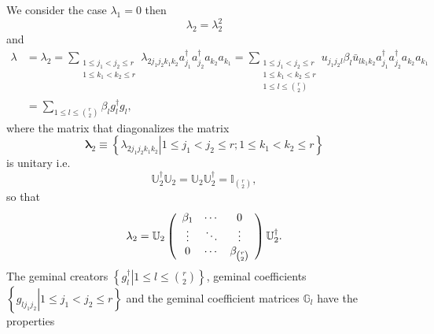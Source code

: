\documentclass[aps,preprint,amsfonts,amssymb,showpacs,showkeys]{revtex4}%
\begin{document}
We consider the case $\lambda_{1}=0$ then
\begin{equation}
\lambda_{2}=\lambda_{2}^{2} \label{idem2}%
\end{equation}
and%
\begin{align}
\lambda &  =\lambda_{2}=\sum_{\substack{1\leq j_{1}<j_{2}\leq r\\1\leq
k_{1}<k_{2}\leq r}}\lambda_{2j_{1}j_{2}k_{1}k_{2}}a_{j_{1}}^{\dagger}a_{j_{2}%
}^{\dagger}a_{k_{2}}a_{k_{1}}=\sum_{\substack{1\leq j_{1}<j_{2}\leq r\\1\leq
k_{1}<k_{2}\leq r\\1\leq l\leq\binom{r}{2}}}u_{j_{1}j_{2}l}\beta_{l}\bar
{u}_{lk_{1}k_{2}}a_{j_{1}}^{\dagger}a_{j_{2}}^{\dagger}a_{k_{2}}a_{k_{1}%
}\nonumber\\
&  =\sum_{1\leq l\leq\binom{r}{2}}\beta_{l}g_{l}^{\dagger}g_{l},
\label{expan_lamda2}%
\end{align}
where the matrix that diagonalizes the matrix
\begin{equation}
\mathbf{\lambda}_{2}\equiv\left\{  \left.  \lambda_{2j_{1}j_{2}k_{1}k_{2}%
}\right\vert 1\leq j_{1}<j_{2}\leq r;1\leq k_{1}<k_{2}\leq r\right\}
\end{equation}
is unitary i.e.
\begin{equation}
\mathbb{U}_{2}^{\dagger}\mathbb{U}_{2}=\mathbb{U}_{2}\mathbb{U}_{2}^{\dagger
}=\mathbb{I}_{\binom{r}{2}},
\end{equation}
so that
\begin{equation}
\mathbf{\lambda}_{2}=\mathbb{U}_{2}\left(
\begin{array}
[c]{ccc}%
\beta_{1} & \cdots & 0\\
\vdots & \ddots & \vdots\\
0 & \cdots & \beta_{\binom{r}{2}}%
\end{array}
\right)  \mathbb{U}_{2}^{\dagger}.
\end{equation}
The geminal creators $\left\{  \left.  g_{l}^{\dagger}\right\vert 1\leq
l\leq\binom{r}{2}\right\}  $, geminal coefficients $\left\{  \left.
g_{lj_{1}j_{2}}\right\vert 1\leq j_{1}<j_{2}\leq r\right\}  $ and the geminal
coefficient matrices $\mathbb{G}_{l}$ have the properties%
\end{document}
